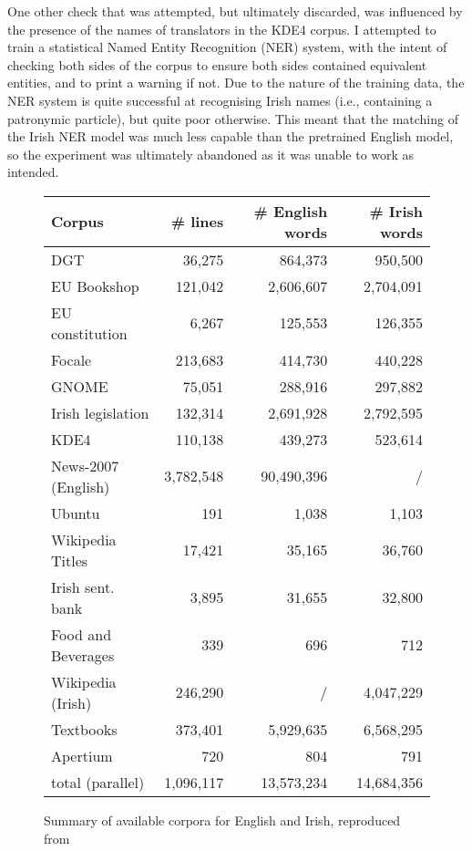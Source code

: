 One other check that was attempted, but ultimately discarded, was influenced by the presence of the names of
translators in the KDE4 corpus. I attempted to train a statistical Named Entity Recognition (NER) system, with the
intent of checking both sides of the corpus to ensure both sides contained equivalent entities, and to print
a warning if not. Due to the nature of the training data, the NER system is quite successful at recognising
Irish names (i.e., containing a patronymic particle), but quite poor otherwise. This meant that the matching
of the Irish NER model was much less capable than the pretrained English model, so the experiment was
ultimately abandoned as it was unable to work as intended.


\begin{figure*}
\begin{center}
\begin{tabular}{l|r|r|r}
\hline
Corpus & \# lines & \# English words & \# Irish words \\
\hline
DGT & 36,275 & 864,373 & 950,500 \\
EU Bookshop & 121,042 & 2,606,607 & 2,704,091 \\
EU constitution & 6,267 & 125,553 & 126,355 \\
Focale & 213,683 & 414,730 & 440,228 \\
GNOME & 75,051 & 288,916 & 297,882 \\
Irish legislation & 132,314 & 2,691,928 & 2,792,595 \\
KDE4 & 110,138 & 439,273 & 523,614 \\
News-2007 (English) & 3,782,548 & 90,490,396 & / \\
Ubuntu & 191 & 1,038 & 1,103 \\
Wikipedia Titles & 17,421 & 35,165 & 36,760 \\
Irish sent. bank & 3,895 & 31,655 & 32,800 \\
Food and Beverages & 339 & 696 & 712 \\
Wikipedia (Irish) & 246,290 & / & 4,047,229 \\
Textbooks & 373,401 & 5,929,635 & 6,568,295 \\
Apertium & 720 & 804 & 791 \\
\hline
total (parallel) & 1,096,117 & 13,573,234 & 14,684,356 \\
\hline
\end{tabular}
\end{center}
\caption{Summary of available corpora for English and Irish, reproduced from \protect\citet[p. 568]{ARCAN16.9}}
\label{fig:smtcorpora}
\end{figure*}

